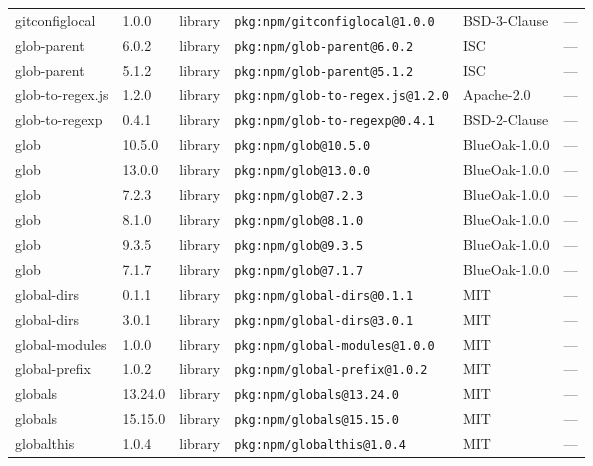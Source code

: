 \documentclass[11pt,a4paper]{article}
\begin{document}
\begin{longtable}{|p{4cm}|p{2cm}|p{1.6cm}|p{5cm}|p{1.5cm}|p{3.5cm}|}
\raggedright gitconfiglocal & 1.0.0 & library & \small\texttt{pkg:npm/gitconfiglocal@1.0.0} & BSD-3-Clause & \small — \\
\raggedright glob-parent & 6.0.2 & library & \small\texttt{pkg:npm/glob-parent@6.0.2} & ISC & \small — \\
\raggedright glob-parent & 5.1.2 & library & \small\texttt{pkg:npm/glob-parent@5.1.2} & ISC & \small — \\
\raggedright glob-to-regex.js & 1.2.0 & library & \small\texttt{pkg:npm/glob-to-regex.js@1.2.0} & Apache-2.0 & \small — \\
\raggedright glob-to-regexp & 0.4.1 & library & \small\texttt{pkg:npm/glob-to-regexp@0.4.1} & BSD-2-Clause & \small — \\
\raggedright glob & 10.5.0 & library & \small\texttt{pkg:npm/glob@10.5.0} & BlueOak-1.0.0 & \small — \\
\raggedright glob & 13.0.0 & library & \small\texttt{pkg:npm/glob@13.0.0} & BlueOak-1.0.0 & \small — \\
\raggedright glob & 7.2.3 & library & \small\texttt{pkg:npm/glob@7.2.3} & BlueOak-1.0.0 & \small — \\
\raggedright glob & 8.1.0 & library & \small\texttt{pkg:npm/glob@8.1.0} & BlueOak-1.0.0 & \small — \\
\raggedright glob & 9.3.5 & library & \small\texttt{pkg:npm/glob@9.3.5} & BlueOak-1.0.0 & \small — \\
\raggedright glob & 7.1.7 & library & \small\texttt{pkg:npm/glob@7.1.7} & BlueOak-1.0.0 & \small — \\
\raggedright global-dirs & 0.1.1 & library & \small\texttt{pkg:npm/global-dirs@0.1.1} & MIT & \small — \\
\raggedright global-dirs & 3.0.1 & library & \small\texttt{pkg:npm/global-dirs@3.0.1} & MIT & \small — \\
\raggedright global-modules & 1.0.0 & library & \small\texttt{pkg:npm/global-modules@1.0.0} & MIT & \small — \\
\raggedright global-prefix & 1.0.2 & library & \small\texttt{pkg:npm/global-prefix@1.0.2} & MIT & \small — \\
\raggedright globals & 13.24.0 & library & \small\texttt{pkg:npm/globals@13.24.0} & MIT & \small — \\
\raggedright globals & 15.15.0 & library & \small\texttt{pkg:npm/globals@15.15.0} & MIT & \small — \\
\raggedright globalthis & 1.0.4 & library & \small\texttt{pkg:npm/globalthis@1.0.4} & MIT & \small — \\

\end{longtable}
\end{document}
